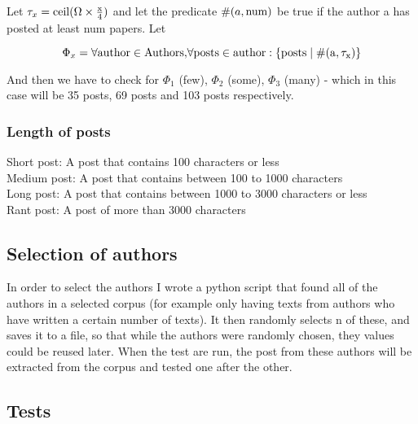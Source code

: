 Let $\tau_x = \rm{ceil}(\Omega \times \frac{x}{4})$ and let the predicate $\#(a, \rm{num})$ be true if the author a has posted at least num papers. Let 

$$\Phi_x = \forall\rm{ author }\in\rm{ Authors, }\forall\rm{ posts }\in\rm{ author }: \{\rm{posts }\mid \#(a, \tau_x)\}$$ 
 
And then we have to check for $\Phi_1$ (few), $\Phi_2$ (some), $\Phi_3$ (many) - which in this case will be 35 posts, 69 posts and 103 posts respectively.

\subsubsection*{Length of posts}
Short post: A post that contains 100 characters or less\\
Medium post: A post that contains between 100 to 1000 characters\\
Long post: A post that contains between 1000 to 3000 characters or less\\
Rant post: A post of more than 3000 characters


\subsection{Selection of authors}
In order to select the authors I wrote a python script that found all of the authors in a selected corpus (for example only having texts from authors who have written a certain number of texts). It then randomly selects n of these, and saves it to a file, so that while the authors were randomly chosen, they values could be reused later. When the test are run, the post from these authors will be extracted from the corpus and tested one after the other.


\subsection{Tests}




